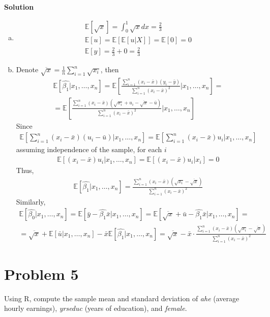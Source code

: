 \documentclass[a4paper]{article}
\newcommand{\expect}{\mathbb{E}}
\begin{document}
\textbf{Solution}
\begin{enumerate}[a.]
	\item 
	\begin{align*}
	\expect[\sqrt{x}] = \int_{0}^1 \sqrt{x}dx = \frac{2}{3}\\
	\expect[u] = \expect[\expect[u|X]] = \expect[0] = 0\\
	\expect[y] = \frac{2}{3} + 0 = \frac{2}{3}
	\end{align*}
	\item Denote $\overline{\sqrt{x}} = \frac{1}{n}\sum_{i=1}^n \sqrt{x_i}$, then
	\begin{align*}
	\expect[\hat{\beta_1}|x_1, \dots, x_n] = \expect \left[\frac{\sum_{i=1}^n (x_i - \bar{x})(y_i - \bar{y})}{\sum_{i=1}^n (x_i - \bar{x})^2}\bigg|x_1, \dots, x_n\right] =\\
	= \expect \left[\frac{\sum_{i=1}^n (x_i - \bar{x})(\sqrt{x_i} + u_i - \overline{\sqrt{x}} -  \bar{u})}{\sum_{i=1}^n (x_i - \bar{x})^2}\bigg|x_1, \dots, x_n\right]
	\end{align*}
	Since
	\begin{align*}
	\expect \left[ \sum_{i=1}^n (x_i - \bar{x})(u_i - \bar{u})\bigg|x_1, \dots, x_n\right] = \expect \left[\sum_{i=1}^n (x_i - \bar{x})u_i\bigg|x_1, \dots, x_n\right]
	\end{align*}
	assuming independence of the sample, for each $i$
	\begin{align*}
	\expect[(x_i - \bar{x})u_i|x_1, \dots, x_n] = \expect[(x_i - \bar{x})u_i|x_i] = 0
	\end{align*}
	Thus, 
	\begin{align*}
	\expect[\hat{\beta_1}|x_1, \dots, x_n] = \frac{\sum_{i=1}^n (x_i - \bar{x})(\sqrt{x_i} - \overline{\sqrt{x}})}{\sum_{i=1}^n (x_i - \bar{x})^2}
	\end{align*}
	Similarly,
	\begin{align*}
	\expect[\hat{\beta_0}|x_1, \dots, x_n] = \expect[\bar{y} - \hat{\beta_1}\bar{x}|x_1, \dots, x_n] = \expect[\overline{\sqrt{x}} + \bar{u} - \hat{\beta_1}\bar{x}|x_1, \dots, x_n] = \\
	=\overline{\sqrt{x}} + \expect[\bar{u}|x_1, \dots, x_n] - \bar{x}\expect[\hat{\beta_1}|x_1, \dots, x_n] = \overline{\sqrt{x}} - \bar{x} \cdot \frac{\sum_{i=1}^n (x_i - \bar{x})(\sqrt{x_i} - \overline{\sqrt{x}})}{\sum_{i=1}^n (x_i - \bar{x})^2}
	\end{align*}
	\end{enumerate}
\section*{Problem 5}
 Using R, compute the sample mean and standard deviation of \textit{ahe} (average hourly earnings),
\textit{yrseduc} (years of education), and \textit{female}.
\end{document}
